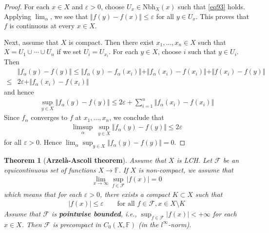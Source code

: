 \documentclass[12pt,b5paper,notitlepage]{article}
\theoremstyle{definition}
\theoremstyle{plain}
\newtheorem{thm}[df]{Theorem}
\newcommand{\scr}{\mathscr}
\newcommand{\Fbb}{\mathbb F}
\newcommand{\Nbh}{\mathrm{Nbh}}
\newcommand{\eps}{\varepsilon}
\numberwithin{equation}{section}
\begin{document}
\begin{proof}
For each $x\in X$ and $\eps>0$, choose  $U_x\in\Nbh_X(x)$ such that \eqref{eq93} holds. Applying $\lim_\alpha$, we see that $\Vert f(y)-f(x)\Vert\leq\eps$ for all $y\in U_x$. This proves that $f$ is continuous at every $x\in X$.

Next, assume that $X$ is compact. Then there exist $x_1,\dots,x_n\in X$ such that $X=U_1\cup\cdots\cup U_n$ if we set $U_i=U_{x_i}$. For each $y\in X$, choose $i$ such that $y\in U_i$. Then
\begin{align*}
&\Vert f_\alpha(y)-f(y)\Vert\leq\Vert f_\alpha(y)-f_\alpha(x_i)\Vert+\Vert f_\alpha(x_i)-f(x_i)\Vert+\Vert f(x_i)-f(y)\Vert\\
\leq& 2\eps+\Vert f_\alpha(x_i)-f(x_i)\Vert
\end{align*}
and hence
\begin{align*}
\sup_{y\in X}\Vert f_\alpha(y)-f(y)\Vert\leq 2\eps+\sum_{i=1}^n\Vert f_\alpha(x_i)-f(x_i)\Vert
\end{align*}
Since $f_\alpha$ converges to $f$ at $x_1,\dots,x_n$, we conclude that
\begin{align*}
\limsup_\alpha ~\sup_{y\in X}\Vert f_\alpha(y)-f(y)\Vert\leq 2\eps
\end{align*}
for all $\eps>0$. Hence $\lim_\alpha\sup_{y\in X}\Vert f_\alpha(y)-f(y)\Vert=0$.
\end{proof}

\begin{thm}[\textbf{Arzel\`a-Ascoli theorem}]
Assume that $X$ is LCH. Let $\scr F$ be an equicontinuous set of functions $X\rightarrow\Fbb$. If $X$ is non-compact, we assume that 
\begin{align}
\lim_{x\rightarrow\infty}\sup_{f\in\scr F}|f(x)|=0
\end{align}
which means that for each $\eps>0$, there exists a compact $K\subset X$ such that
\begin{align*}
|f(x)|\leq\eps\qquad\text{for all }f\in\scr F,x\in X\setminus K
\end{align*}
Assume that $\scr F$ is \textbf{pointwise bounded}, i.e., $\sup_{f\in\scr F}|f(x)|<+\infty$ for each $x\in X$. Then $\scr F$ is precompact in $C_0(X,\Fbb)$ (in the $l^\infty$-norm).
\end{thm}
\end{document}

